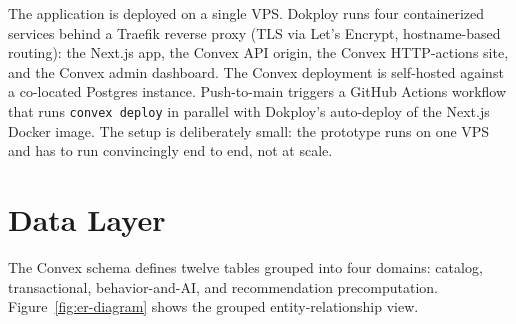 The application is deployed on a single VPS. Dokploy runs
four containerized services behind a Traefik reverse proxy (TLS
via Let's Encrypt, hostname-based routing): the Next.js app, the
Convex API origin, the Convex HTTP-actions site, and the Convex
admin dashboard. The Convex deployment is self-hosted against a
co-located Postgres instance. Push-to-main triggers a GitHub
Actions workflow that runs \texttt{convex deploy} in parallel
with Dokploy's auto-deploy of the Next.js Docker image. The
setup is deliberately small: the prototype runs on one VPS and
has to run convincingly end to end, not at scale.

\section{Data Layer}
\label{sec:sys-data}

The Convex schema defines twelve tables grouped into four
domains: catalog, transactional, behavior-and-AI, and
recommendation precomputation.
Figure~\ref{fig:er-diagram} shows the grouped
entity-relationship view.

